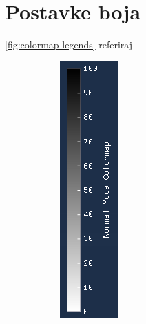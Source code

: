 \documentclass[times, utf8, diplomski]{fer}
\begin{document}
\section{Postavke boja} \label{color-settings-section}
\ref{fig:colormap-legends} referiraj \citep{easing}\\
\begin{figure} [h]
     \centering
     \begin{subfigure}[h]{0.15\textwidth}
         \centering
         \includegraphics[width=\textwidth]{linear_colormap.png}

\end{subfigure}
\end{figure}
\end{document}
